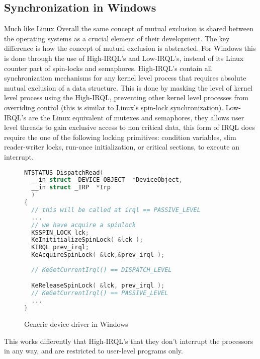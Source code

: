 \subsection{Synchronization in Windows}
Much like Linux Overall the same concept of mutual exclusion is shared between the operating systems as a crucial element of their development. The key difference is how the concept of mutual exclusion is abstracted. For Windows this is done through the use of High-IRQL's and Low-IRQL's, instead of its Linux counter part of spin-locks and semaphores. High-IRQL's contain all synchronization mechanisms for any kernel level process that requires absolute mutual exclusion of a data structure. This is done by masking the level of kernel level process using the High-IRQL, preventing other kernel level processes from overriding control (this is similar to Linux's spin-lock synchronization). Low-IRQL's are the Linux equivalent of mutexes and semaphores, they allows user level threads to gain exclusive access to non critical data, this form of IRQL does require the one of the following locking primitives: condition variables, slim reader-writer locks, run-once initialization, or critical sections, to execute an interrupt.

\begin{figure}[h]
\begin{lstlisting}[language=C, style=customc]
NTSTATUS DispatchRead(
  __in struct _DEVICE_OBJECT  *DeviceObject,
  __in struct _IRP  *Irp
  )
{
  // this will be called at irql == PASSIVE_LEVEL
  ...
  // we have acquire a spinlock
  KSSPIN_LOCK lck;
  KeInititializeSpinLock( &lck );
  KIRQL prev_irql;
  KeAcquireSpinLock( &lck,&prev_irql );
  
  // KeGetCurrentIrql() == DISPATCH_LEVEL 

  KeReleaseSpinLock( &lck, prev_irql );
  // KeGetCurrentIrql() == PASSIVE_LEVEL 
  ...
}
\end{lstlisting}
\caption{ Generic device driver in Windows\cite{windowsD95:online}}
\end{figure}

This works differently that High-IRQL's that they don't interrupt the processors in any way, and are restricted to user-level programs only\cite{windowsbookpt1}.
